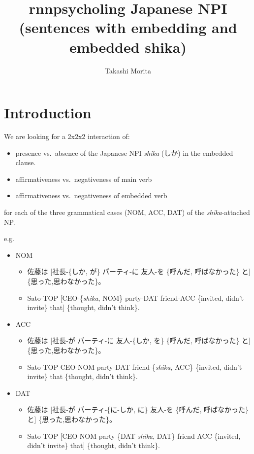 \documentclass[]{ltjsarticle}
\title{rnnpsycholing Japanese NPI (sentences with embedding and embedded shika)}
\author{Takashi Morita}
\date{}
\providecommand{\tightlist}{%
  \setlength{\itemsep}{0pt}\setlength{\parskip}{0pt}}
\begin{document}
\maketitle

{
\setcounter{tocdepth}{3}
\tableofcontents
}
\section{Introduction}\label{introduction}

We are looking for a 2x2x2 interaction of:

\begin{itemize}
\tightlist
\item
  presence vs.~absence of the Japanese NPI \emph{shika} (しか) in the
  embedded clause.
\item
  affirmativeness vs.~negativeness of main verb
\item
  affirmativeness vs.~negativeness of embedded verb
\end{itemize}

for each of the three grammatical cases (NOM, ACC, DAT) of the
\emph{shika}-attached NP.

e.g.

\begin{itemize}
\tightlist
\item
  NOM

  \begin{itemize}
  \tightlist
  \item
    佐藤は {[}社長-\{しか, が\} パーティ-に 友人-を \{呼んだ,
    呼ばなかった\} と{]} \{思った,思わなかった\}。
  \item
    Sato-TOP {[}CEO-\{\emph{shika}, NOM\} party-DAT friend-ACC
    \{invited, didn't invite\} that{]} \{thought, didn't think\}.
  \end{itemize}
\item
  ACC

  \begin{itemize}
  \tightlist
  \item
    佐藤は {[}社長-が パーティ-に 友人-\{しか, を\} \{呼んだ,
    呼ばなかった\} と{]} \{思った,思わなかった\}。
  \item
    Sato-TOP CEO-NOM party-DAT friend-\{\emph{shika}, ACC\} \{invited,
    didn't invite\} that \{thought, didn't think\}.
  \end{itemize}
\item
  DAT

  \begin{itemize}
  \tightlist
  \item
    佐藤は {[}社長-が パーティ-\{に-しか, に\} 友人-を \{呼んだ,
    呼ばなかった\} と{]} \{思った,思わなかった\}。
  \item
    Sato-TOP {[}CEO-NOM party-\{DAT-\emph{shika}, DAT\} friend-ACC
    \{invited, didn't invite\} that{]} \{thought, didn't think\}.
  \end{itemize}
\end{itemize}
\end{document}
